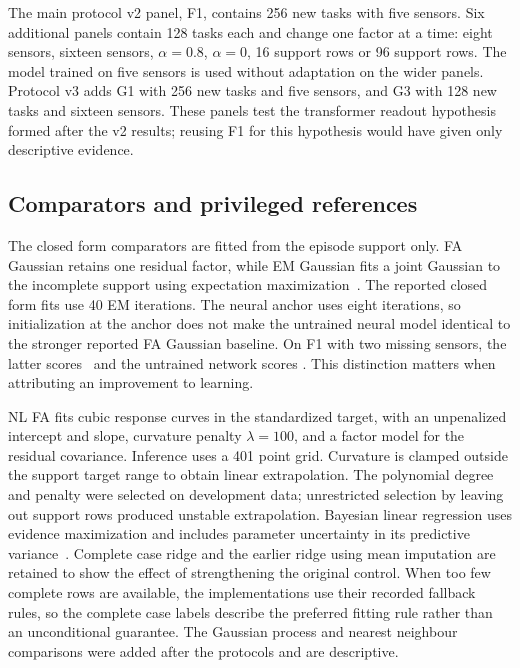 The main protocol v2 panel, F1, contains 256 new tasks with five sensors. Six additional panels contain 128 tasks each and change one factor at a time: eight sensors, sixteen sensors, $\alpha=0.8$, $\alpha=0$, 16 support rows or 96 support rows. The model trained on five sensors is used without adaptation on the wider panels. Protocol v3 adds G1 with 256 new tasks and five sensors, and G3 with 128 new tasks and sixteen sensors. These panels test the transformer readout hypothesis formed after the v2 results; reusing F1 for this hypothesis would have given only descriptive evidence.

\subsection{Comparators and privileged references}

The closed form comparators are fitted from the episode support only. FA Gaussian retains one residual factor, while EM Gaussian fits a joint Gaussian to the incomplete support using expectation maximization~\citep{dempster1977em}. The reported closed form fits use 40 EM iterations. The neural anchor uses eight iterations, so initialization at the anchor does not make the untrained neural model identical to the stronger reported FA Gaussian baseline. On F1 with two missing sensors, the latter scores \FfaOnekc\ and the untrained network scores \Untrainedkc. This distinction matters when attributing an improvement to learning.

NL FA fits cubic response curves in the standardized target, with an unpenalized intercept and slope, curvature penalty $\lambda=100$, and a factor model for the residual covariance. Inference uses a 401 point grid. Curvature is clamped outside the support target range to obtain linear extrapolation. The polynomial degree and penalty were selected on development data; unrestricted selection by leaving out support rows produced unstable extrapolation. Bayesian linear regression uses evidence maximization and includes parameter uncertainty in its predictive variance~\citep{mackay1992bayesian}. Complete case ridge and the earlier ridge using mean imputation are retained to show the effect of strengthening the original control. When too few complete rows are available, the implementations use their recorded fallback rules, so the complete case labels describe the preferred fitting rule rather than an unconditional guarantee. The Gaussian process and nearest neighbour comparisons were added after the protocols and are descriptive.

